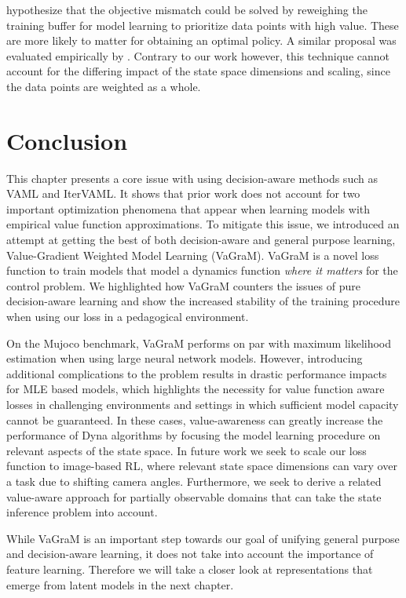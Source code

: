 \cite{lambert202objective} hypothesize that the objective mismatch could be solved by reweighing the training buffer for model learning to prioritize data points with high value. These are more likely to matter for obtaining an optimal policy. A similar proposal was evaluated empirically by \cite{nair2020goal}. Contrary to our work however, this technique cannot account for the differing impact of the state space dimensions and scaling, since the data points are weighted as a whole.


\section{Conclusion}
This chapter presents a core issue with using decision-aware methods such as VAML and IterVAML.
It shows that prior work does not account for two important optimization phenomena that appear when learning models with empirical value function approximations.
To mitigate this issue, we introduced an attempt at getting the best of both decision-aware and general purpose learning, Value-Gradient Weighted Model Learning (VaGraM).
VaGraM is a novel loss function to train models that model a dynamics function \emph{where it matters} for the control problem.
We highlighted how VaGraM counters the issues of pure decision-aware learning and show the increased stability of the training procedure when using our loss in a pedagogical environment.

On the Mujoco benchmark, VaGraM performs on par with maximum likelihood estimation when using large neural network models.
However, introducing additional complications to the problem results in drastic performance impacts for MLE based models, which highlights the necessity for value function aware losses in challenging environments and settings in which sufficient model capacity cannot be guaranteed.
In these cases, value-awareness can greatly increase the performance of Dyna algorithms by focusing the model learning procedure on relevant aspects of the state space.
In future work we seek to scale our loss function to image-based RL, where relevant state space dimensions can vary over a task due to shifting camera angles. 
Furthermore, we seek to derive a related value-aware approach for partially observable domains that can take the state inference problem into account.

While VaGraM is an important step towards our goal of unifying general purpose and decision-aware learning, it does not take into account the importance of feature learning.
Therefore we will take a closer look at representations that emerge from latent models in the next chapter.